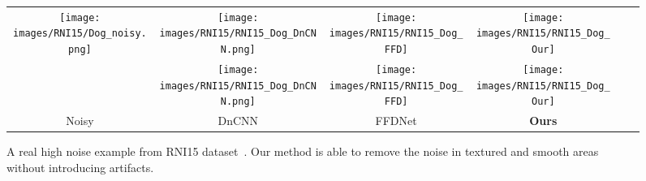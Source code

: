 \documentclass[10pt,twocolumn,letterpaper]{article}
\begin{document}
\begin{figure}
\begin{center}
\begin{tabular}[b]{c@{ } c@{ }  c@{ } c@{ } c@{ } c@{ }	}
    \multirow{2}{*}{\texttt{[image: images/RNI15/Dog\_noisy.png]}} &  
    \texttt{[image: images/RNI15/RNI15\_Dog\_DnCNN.png]}&
  	\texttt{[image: images/RNI15/RNI15\_Dog\_FFD]}&   
    \texttt{[image: images/RNI15/RNI15\_Dog\_Our]}\\
    &
    \texttt{[image: images/RNI15/RNI15\_Dog\_DnCNN.png]}&
  	\texttt{[image: images/RNI15/RNI15\_Dog\_FFD]}&   
    \texttt{[image: images/RNI15/RNI15\_Dog\_Our]}\\
    Noisy    & DnCNN     & FFDNet       &  \textbf{Ours} \\


\end{tabular}
\end{center}
\vspace*{-2mm}
\caption{A real high noise example from RNI15 dataset~\cite{lebrun2015NC}. Our method is able to remove the noise in textured and smooth areas without introducing artifacts.}
\label{fig:NC_high}
\vspace*{-3mm}
\end{figure}


\begin{table}
\centering
{}
\caption{The quantitative results (in PSNR (dB)) for the SSID~\cite{abdelhamed2018high} and Nam~\cite{nam2016holistic} datasets.}
\label{table:Nam_SSID}
\vspace*{-5mm}
\end{table}
\end{document}
